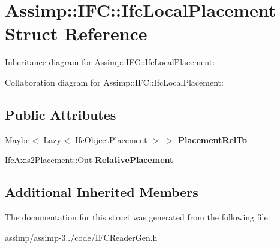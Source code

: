 \hypertarget{struct_assimp_1_1_i_f_c_1_1_ifc_local_placement}{\section{Assimp\+:\+:I\+F\+C\+:\+:Ifc\+Local\+Placement Struct Reference}
\label{struct_assimp_1_1_i_f_c_1_1_ifc_local_placement}
}


Inheritance diagram for Assimp\+:\+:I\+F\+C\+:\+:Ifc\+Local\+Placement\+:


Collaboration diagram for Assimp\+:\+:I\+F\+C\+:\+:Ifc\+Local\+Placement\+:
\subsection*{Public Attributes}
\begin{DoxyCompactItemize}
\item 
\hypertarget{struct_assimp_1_1_i_f_c_1_1_ifc_local_placement_a4aa9187eeef7283a2e0d0979b2f5675a}{\hyperlink{struct_assimp_1_1_s_t_e_p_1_1_maybe}{Maybe}$<$ \hyperlink{struct_assimp_1_1_s_t_e_p_1_1_lazy}{Lazy}$<$ \hyperlink{struct_assimp_1_1_i_f_c_1_1_ifc_object_placement}{Ifc\+Object\+Placement} $>$ $>$ {\bfseries Placement\+Rel\+To}}\label{struct_assimp_1_1_i_f_c_1_1_ifc_local_placement_a4aa9187eeef7283a2e0d0979b2f5675a}

\item 
\hypertarget{struct_assimp_1_1_i_f_c_1_1_ifc_local_placement_ac326331e1c30d4a141a3c54b52262a79}{\hyperlink{classboost_1_1shared__ptr}{Ifc\+Axis2\+Placement\+::\+Out} {\bfseries Relative\+Placement}}\label{struct_assimp_1_1_i_f_c_1_1_ifc_local_placement_ac326331e1c30d4a141a3c54b52262a79}

\end{DoxyCompactItemize}
\subsection*{Additional Inherited Members}


The documentation for this struct was generated from the following file\+:\begin{DoxyCompactItemize}
\item 
assimp/assimp-\/3../code/I\+F\+C\+Reader\+Gen.\+h\end{DoxyCompactItemize}
